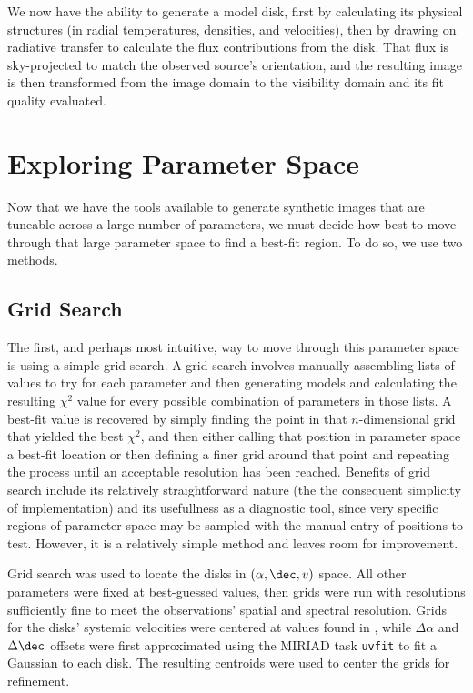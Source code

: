 We now have the ability to generate a model disk, first by calculating its physical structures (in radial temperatures, densities, and velocities), then by drawing on radiative transfer to calculate the flux contributions from the disk. That flux is sky-projected to match the observed source's orientation, and the resulting image is then transformed from the image domain to the visibility domain and its fit quality evaluated.



\section{Exploring Parameter Space}
\label{section:param_space}

Now that we have the tools available to generate synthetic images that are tuneable across a large number of parameters, we must decide how best to move through that large parameter space to find a best-fit region. To do so, we use two methods.

\subsection{Grid Search}
\label{subsection:grid_search}
The first, and perhaps most intuitive, way to move through this parameter space is using a simple grid search. A grid search involves manually assembling lists of values to try for each parameter and then generating models and calculating the resulting $\chi^2$ value for every possible combination of parameters in those lists. A best-fit value is recovered by simply finding the point in that $n$-dimensional grid that yielded the best $\chi^2$, and then either calling that position in parameter space a best-fit location or then defining a finer grid around that point and repeating the process until an acceptable resolution has been reached. Benefits of grid search include its relatively straightforward nature (the the consequent simplicity of implementation) and its usefullness as a diagnostic tool, since very specific regions of parameter space may be sampled with the manual entry of positions to test. However, it is a relatively simple method and leaves room for improvement.

Grid search was used to locate the disks in $(\alpha, \dec, v)$ space. All other parameters were fixed at best-guessed values, then grids were run with resolutions sufficiently fine to meet the observations' spatial and spectral resolution. Grids for the disks' systemic velocities were centered at values found in \cite{Williams2014}, while $\Delta \alpha$ and $\Delta \dec$ offsets were first approximated using the MIRIAD task \texttt{uvfit} to fit a Gaussian to each disk. The resulting centroids were used to center the grids for refinement.


